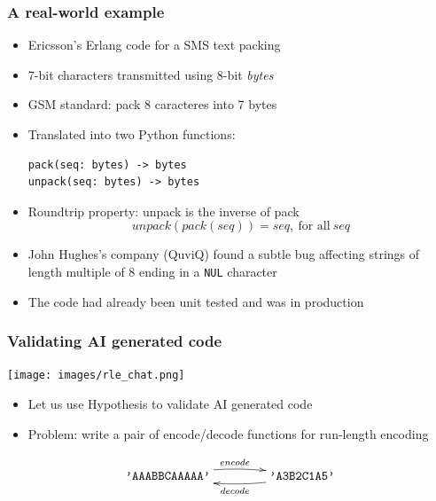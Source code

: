 \documentclass{beamer}
\newcommand{\bs}{\symbol{92}}
\begin{document}
\begin{frame}
  \frametitle{A real-world example}
  \begin{itemize}
  \item Ericsson's Erlang code for a SMS text packing
  \item 7-bit characters transmitted using 8-bit \emph{bytes}
  \item GSM standard: pack 8 caracteres into 7 bytes
\item Translated into two Python functions:
\begin{verbatim}
pack(seq: bytes) -> bytes
unpack(seq: bytes) -> bytes
\end{verbatim}
\item Roundtrip property: unpack is the inverse of pack
  \[ unpack(pack(seq)) = seq, ~\text{for all}~ seq \]
\end{itemize}

\framebreak

  \begin{itemize}
  \item John Hughes's company (QuviQ) found a subtle bug 
    affecting strings of length multiple of 8
    ending in a \texttt{\bs NUL} character
  \item The code had already been unit tested and
    was in production
  \end{itemize}
\end{frame}

\begin{frame}[allowframebreaks]
  \frametitle{Validating AI generated code}

    \begin{center}
\texttt{[image: images/rle\_chat.png]}
  \end{center}
  
  \begin{itemize}
  \item Let us use Hypothesis to validate AI generated code
  \item Problem: write a pair of encode/decode functions
    for \alert{run-length encoding}   
  \end{itemize}

  \[ \xymatrix@-0.5pc {
      \texttt{'AAABBCAAAAA'}\ar@/^/[rr]^{encode} &
      & \texttt{'A3B2C1A5'}\ar@/^/[ll]^{decode}
    }
  \]

\end{frame}
\end{document}
